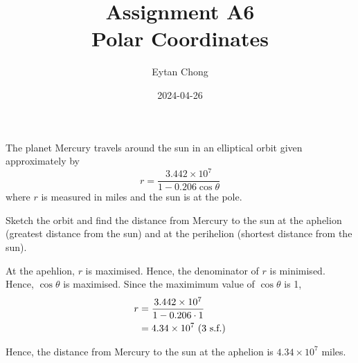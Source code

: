 \documentclass{echw}
\title{Assignment A6\\Polar Coordinates}
\author{Eytan Chong}
\date{2024-04-26}
\begin{document}
    \problem{}
        The planet Mercury travels around the sun in an elliptical orbit given approximately by
        \begin{equation*}
            r = \dfrac{3.442 \times 10^7}{1 - 0.206\cos\theta}
        \end{equation*}
        \noindent where $r$ is measured in miles and the sun is at the pole.

        Sketch the orbit and find the distance from Mercury to the sun at the aphelion (greatest distance from the sun) and at the perihelion (shortest distance from the sun).

    \solution
        \begin{center}
        \end{center}

        At the apehlion, $r$ is maximised. Hence, the denominator of $r$ is minimised. Hence, $\cos \theta$ is maximised. Since the maximimum value of $\cos \theta$ is 1,
        \begin{align*}
            r &= \dfrac{3.442 \times 10^7}{1 - 0.206\cdot1}\\
            &= 4.34 \times 10^7 \text{ (3 s.f.)}
        \end{align*}

        Hence, the distance from Mercury to the sun at the aphelion is $4.34 \times 10^7$ miles.

\end{document}

